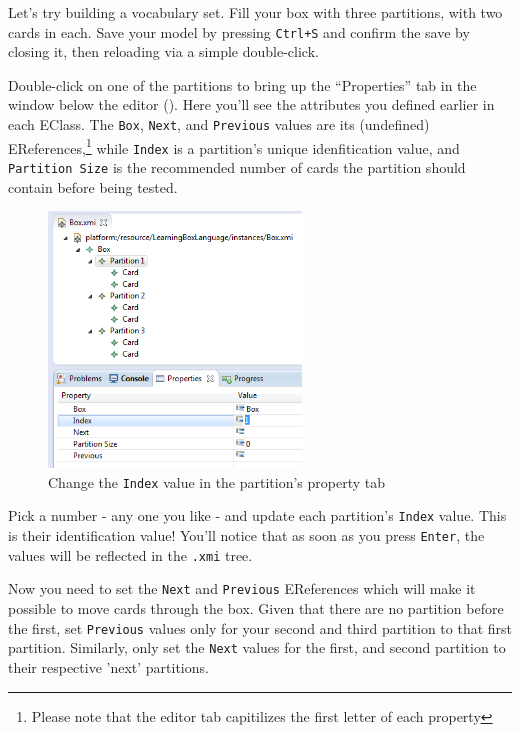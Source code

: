 \begin{stepbystep}
\item Let's try building a vocabulary set. Fill your box with three partitions, with two cards in each. Save your model by pressing
\texttt{Ctrl+S} and confirm the save by closing it, then reloading via a simple double-click.

\item Double-click on one of the partitions to bring up the ``Properties'' tab in the window below the editor
(). Here you'll see the attributes you defined earlier in each EClass. The \texttt{Box}, \texttt{Next}, and
\texttt{Previous} values are its (undefined) EReferences,\footnote{Please note that the editor tab capitilizes the first letter of each property} while \texttt{Index} is a
partition's unique idenfitication value, and \texttt{Partition Size} is the recommended number of cards the partition should contain before being tested.

\begin{figure}[h]
	\centering
  \includegraphics[width=0.6\textwidth]{../../org.moflon.doc.handbook.02_leitnersLearningBox/3_creatingInstance/04_images/eclipse_propertiesTab}
	\caption{Change the \texttt{Index} value in the partition's property tab}
	\label{eclipse:properties_partition}
\end{figure}
\FloatBarrier

\vspace{0.5cm}

\item Pick a number - any one you like - and update each partition's \texttt{Index} value. This is their identification value! You'll
notice that as soon as you press \texttt{Enter}, the values will be reflected in the \texttt{.xmi} tree.

\item Now you need to set the \texttt{Next} and \texttt{Previous} EReferences which will make it possible to move cards through the
box. Given that there are no partition before the first, set \texttt{Previous} values only for your second and third partition to that first partition.
Similarly, only set the \texttt{Next} values for the first, and second partition to their respective 'next' partitions.


\end{stepbystep}
